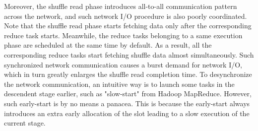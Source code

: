 Moreover, the shuffle read phase introduces all-to-all communication pattern across the network, and such network I/O procedure is also poorly coordinated.
Note that the shuffle read phase starts fetching data only after the corresponding reduce task starts.
Meanwhile, the reduce tasks belonging to a same execution phase are scheduled at the same time by default. 
As a result, all the corresponding reduce tasks start fetching shuffle data almost simultaneously.
Such synchronized network communication causes a burst demand for network I/O, which in turn greatly enlarges the shuffle read completion time. 
To desynchronize the network communication, an intuitive way is to launch some tasks in the descendent stage earlier, such as "slow-start" from Hadoop MapReduce\cite{hadoop}. 
However, such early-start is by no means a panacea. 
This is because the early-start always introduces an extra early allocation of the slot leading to a slow execution of the current stage.



